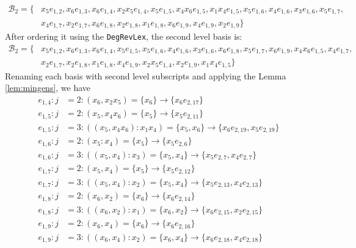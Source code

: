 \documentclass{article}
\theoremstyle{definition}
\theoremstyle{remark}
\theoremstyle{example}
\begin{document}
\begin{equation}
    \begin{aligned}
        \mathcal{B}_2 = \{&x_5e_{1,2},x_6e_{1,3},x_6e_{1,4},x_2x_5e_{1,4},x_5e_{1,5},x_4x_6e_{1,5},x_1x_4e_{1,5},x_5e_{1,6},x_4e_{1,6},x_3e_{1,6},x_5e_{1,7},\\
        & x_4e_{1,7},x_2e_{1,7},x_6e_{1,8},x_2e_{1,8},x_1e_{1,8},x_6e_{1,9},x_4e_{1,9},x_2e_{1,9}\}
    \end{aligned}
\end{equation}
After ordering it using the \verb+DegRevLex+, the second level basis is:
\begin{equation}
    \begin{aligned}
        \mathcal{B}_2 = \{&x_5e_{1,2},x_6e_{1,3},x_6e_{1,4},x_5e_{1,5},x_5e_{1,6},x_4e_{1,6},x_3e_{1,6},x_6e_{1,8},x_5e_{1,7},x_6e_{1,9},x_4x_6e_{1,5},x_4e_{1,7},\\
        & x_2e_{1,7},x_2e_{1,8},x_1e_{1,8},x_4e_{1,9},x_2x_5e_{1,4},x_2e_{1,9},x_1x_4e_{1,5}\}
    \end{aligned}
\end{equation}
Renaming each basis with second level subscripts and applying the Lemma \ref{lem:mingens}, we have
\begin{align}
    e_{1,4}: j &= 2: (x_6,x_2x_5) = \{x_6\} \rightarrow\{x_6e_{2,17}\}\\
    e_{1,5}: j &= 2: (x_5,x_4x_6) = \{x_5\} \rightarrow\{x_5e_{2,11}\}\\
    e_{1,5}: j &= 3: ((x_5,x_4x_6):x_1x_4) = \{x_5,x_6\} \rightarrow\{x_6e_{2,19},x_5e_{2,19}\}\\
    e_{1,6}: j &= 2: (x_5:x_4) = \{x_5\} \rightarrow\{x_5e_{2,6}\}\\
    e_{1,6}: j &= 3: ((x_5,x_4):x_3) = \{x_5,x_4\} \rightarrow\{x_5e_{2,7},x_4e_{2,7}\}\\    
    e_{1,7}: j &= 2: (x_5,x_4) = \{x_5\} \rightarrow\{x_5e_{2,12}\}\\
    e_{1,7}: j &= 3: ((x_5,x_4):x_2) = \{x_5,x_4\} \rightarrow\{x_5e_{2,13},x_4e_{2,13}\}\\
    e_{1,8}: j &= 2: (x_6,x_2) = \{x_6\} \rightarrow\{x_6e_{2,14}\}\\
    e_{1,8}: j &= 3: ((x_6,x_2):x_1) = \{x_6,x_2\} \rightarrow\{x_6e_{2,15},x_2e_{2,15}\}\\
    e_{1,9}: j &= 2: (x_6,x_4) = \{x_6\} \rightarrow\{x_6e_{2,16}\}\\
    e_{1,9}: j &= 3: ((x_6,x_4):x_2) = \{x_6,x_4\} \rightarrow\{x_6e_{2,18},x_4e_{2,18}\}
\end{align}
\end{document}

